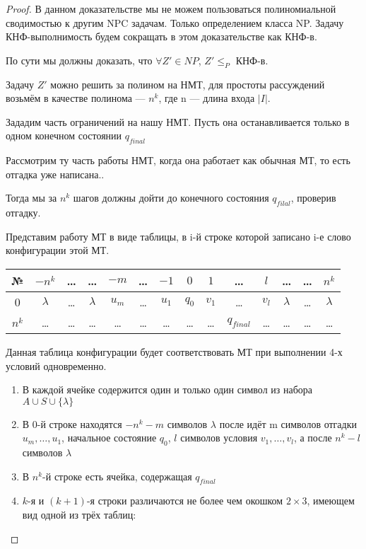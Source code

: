 \begin{proof}
В данном доказательстве мы не можем пользоваться полиномиальной сводимостью к
другим NPC задачам. Только определением класса NP. Задачу КНФ-выполнимость будем
сокращать в этом доказательстве как КНФ-в.

По сути мы должны доказать, что $\forall Z' \in NP$,  $Z' \le_P$ КНФ-в. 

Задачу $Z'$ можно решить за полином на НМТ, для простоты рассуждений возьмём в
качестве полинома --- $n^k$, где n --- длина входа  $|I|$. 

Зададим часть ограничений на нашу НМТ. Пусть она останавливается только в одном
конечном состоянии $q_{final}$

Рассмотрим ту часть работы НМТ, когда она работает как обычная МТ, то есть
отгадка уже написана..

Тогда мы за $n^k$ шагов должны дойти до конечного состояния $q_{filal}$,
проверив отгадку.

Представим работу МТ в виде таблицы, в i-й строке которой записано i-е слово
конфигурации этой МТ.
\begin{table}[htpb]
	\centering
	\label{tab:label}
	\begin{tabular}{|c|c|c|c| c|c|c |c|c|c| c|c|c|c|}
\hline №&$-n^k$& \ldots&\ldots& $-m$& \ldots&$-1$&$0$& $1$ &\ldots&$l$&
		\ldots& \ldots&$n^k$\\
		\hline
		      0&$\lambda$ & \ldots &
		      $\lambda$&$u_m$&\ldots&$u_1$&$q_0$&$v_1$&\ldots&$v_l$
			       &$\lambda$& \ldots&$\lambda$\\\hline
\hline
$n^k$&\ldots&\ldots&\ldots&\ldots&\ldots&\ldots&\ldots&\ldots&$q_{final}$&\ldots&\ldots&\ldots&\ldots\\\hline
	\end{tabular}
\end{table}

Данная таблица конфигурации будет соответствовать МТ при выполнении 4-х условий
одновременно.
\begin{enumerate}
	\item В каждой ячейке содержится один и только один символ из набора $A
		\cup S \cup \{\lambda\}$
	\item В 0-й строке находятся $-n^k - m$ символов  $\lambda$ после идёт m
		символов отгадки $u_m, \ldots, u_1$, начальное состояние $q_0$,  $l$ символов
		условия $v_1, \ldots, v_l$, а после  $n^k-l$ символов  $\lambda$
	\item В $n^k$-й строке есть ячейка, содержащая $q_{final}$
	\item $k$-я и $(k+1)$-я строки различаются не более чем окошком $2\times
		3$, имеющем вид одной из трёх таблиц:


\end{enumerate}
\end{proof}
